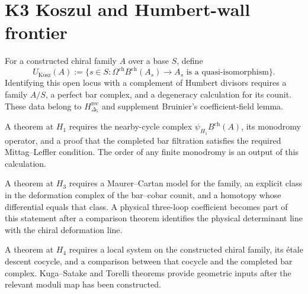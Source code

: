 \section{K3 Koszul and Humbert-wall frontier}
\label{sec:cclimax-supplement-iii}

\begin{remark}
\label{rem:cclimax-koszul-locus}
\ClaimStatusOpen
For a constructed chiral family \(A\) over a base \(S\), define
\begin{equation}
\label{eq:cclimax-koszul-locus-sharp}
 U_{\mathrm{Kosz}}(A)
 :=
 \{s\in S:\Omega^{\mathrm{ch}}B^{\mathrm{ch}}(A_s)\to A_s
 \text{ is a quasi-isomorphism}\}.
\end{equation}
Identifying this open locus with a complement of Humbert divisors
requires a family \(A/S\), a perfect bar complex, and a degeneracy
calculation for its counit.  These data belong to
\(H_{\Delta_5}^{\mathrm{rec}}\) and supplement Bruinier's
coefficient-field lemma.
\end{remark}

\begin{lemma}
\label{lem:cclimax-H1-failure}
\ClaimStatusOpen
A theorem at \(H_1\) requires the nearby-cycle complex
\(\psi_{H_1}B^{\mathrm{ch}}(A)\), its monodromy operator, and a proof
that the completed bar filtration satisfies the required
Mittag--Leffler condition.  The order of any finite monodromy is an
output of this calculation.
\end{lemma}

\begin{lemma}
\label{lem:cclimax-H3-failure}
\ClaimStatusOpen
A theorem at \(H_3\) requires a Maurer--Cartan model for the family, an
explicit class in the deformation complex of the bar--cobar counit,
and a homotopy whose differential equals that class.  A physical
three-loop coefficient becomes part of this statement after a
comparison theorem identifies the physical determinant line with the
chiral deformation line.
\end{lemma}

\begin{lemma}
\label{lem:cclimax-H4-failure}
\ClaimStatusOpen
A theorem at \(H_4\) requires a local system on the constructed chiral
family, its étale descent cocycle, and a comparison between that
cocycle and the completed bar complex.  Kuga--Satake and Torelli
theorems provide geometric inputs after the relevant moduli map has
been constructed.
\end{lemma}


